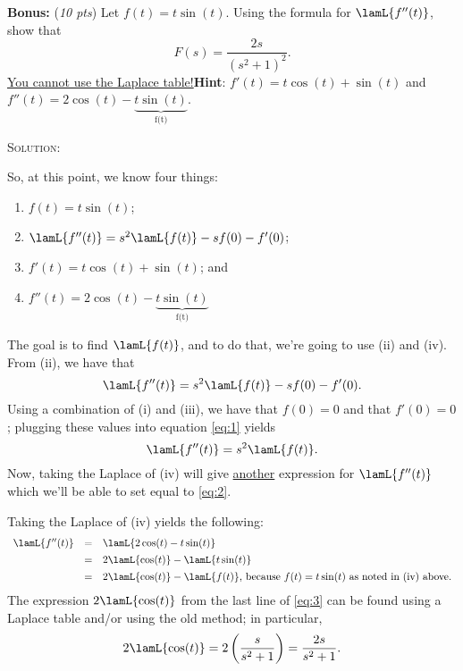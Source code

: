 \documentclass[12pt]{exam}
\newcommand{\sol}{\par\vspace{4.5mm}\hspace{-0.25in}\textsc{Solution:}}
\newcommand{\pts}[1]{(\textit{#1 pts})}
\newcommand{\hintbf}[1]{\textbf{Hint}: #1}
\begin{document}
	\begin{adjustwidth}{-0.125in}{-0.125in}
	\textbf{Bonus:} \pts{10} Let $f(t)=t\sin(t)$. Using the formula for $\lamL\{f''(t)\}$, show that 
	\[F(s)=\frac{2s}{(s^2+1)^2}.\]
	\ul{You cannot use the Laplace table!}\hspace{3mm}\hintbf{$f'(t)=t\cos(t)+\sin(t)$ and $f''(t)=2\cos(t)-\underbrace{t\sin(t)}_{\text{f(t)}}$.}\vspace{-6mm}
	
	\sol\vspace{-3mm}
	\end{adjustwidth}
			
	\noindent So, at this point, we know four things:
	\begin{enumerate}[label=(\roman*),parsep=0mm,topsep=-3mm,leftmargin=0.625in]
		\item $f(t)=t\sin(t)$;
		\item $\lamL\{f''(t)\}=s^2\lamL\{f(t)\}-sf(0)-f'(0)$;
		\item $f'(t)=t\cos(t)+\sin(t)$; and 
		\item $f''(t)=2\cos(t)-\underbrace{t\sin(t)}_{\text{f(t)}}$
	\end{enumerate}
	The goal is to find $\lamL\{f(t)\}$, and to do that, we're going to use (ii) and (iv). From (ii), we have that
	\begin{equation}
		\label{eq:1}
		\lamL\{f''(t)\}=s^2\lamL\{f(t)\}-sf(0)-f'(0).
	\end{equation}
	Using a combination of (i) and (iii), we have that $f(0)=0$ and that $f'(0)=0$; plugging these values into equation \eqref{eq:1} yields
	\begin{equation}
		\label{eq:2}
		\lamL\{f''(t)\}=s^2\lamL\{f(t)\}.
	\end{equation}
	Now, taking the Laplace of (iv) will give \ul{another} expression for $\lamL\{f''(t)\}$ which we'll be able to set equal to \eqref{eq:2}.
	
	Taking the Laplace of (iv) yields the following:
	\begin{equation}\label{eq:3}
	\begin{array}{rcl}
		\lamL\{f''(t)\} & = & \lamL\{2\cos(t)-t\sin(t)\}\\[1.5mm]
		 & = & 2\lamL\{\cos(t)\}-\lamL\{t\sin(t)\}\\[1.5mm]
		 & = & 2\lamL\{\cos(t)\}-\lamL\{f(t)\}\text{, because $f(t)=t\sin(t)$ as noted in (iv) above.}
	\end{array}
	\end{equation}
	\noindent The expression $2\lamL\{\cos(t)\}$ from the last line of \eqref{eq:3} can be found using a Laplace table and/or using the old method; in particular,
	\begin{equation}
		\label{eq:4}
		2\lamL\{\cos(t)\}=2\left(\frac{s}{s^2+1}\right)=\frac{2s}{s^2+1}.
	\end{equation}
	
\end{document}
